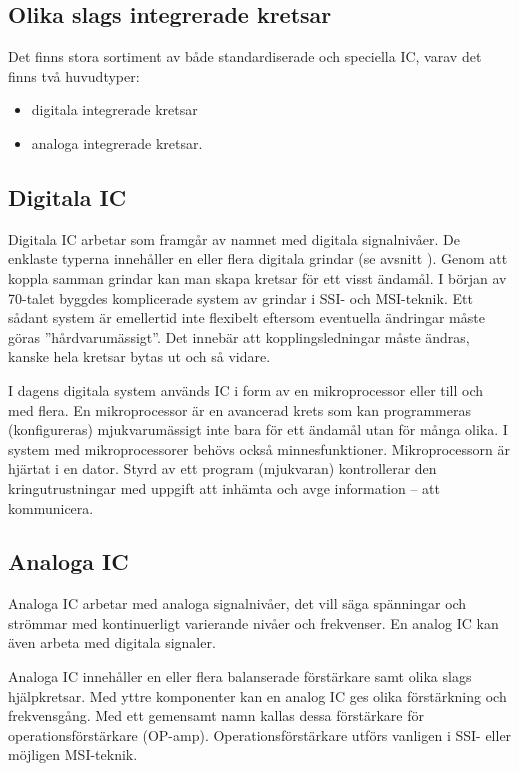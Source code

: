 \subsection{Olika slags integrerade kretsar}

Det finns stora sortiment av både standardiserade och speciella IC, varav det
finns två huvudtyper:
\begin{itemize}
  \item digitala integrerade kretsar
  \item analoga integrerade kretsar.
\end{itemize}

\subsection{Digitala IC}

Digitala IC arbetar som framgår av namnet med digitala signalnivåer.
De enklaste typerna innehåller en eller flera digitala grindar (se avsnitt
).
Genom att koppla samman grindar kan man skapa kretsar för ett visst ändamål.
I början av 70-talet byggdes komplicerade system av grindar i SSI- och
MSI-teknik.
Ett sådant system är emellertid inte flexibelt eftersom eventuella ändringar
måste göras ''hårdvarumässigt''.
Det innebär att kopplingsledningar måste ändras, kanske hela kretsar bytas ut
och så vidare.

I dagens digitala system används IC i form av en mikroprocessor eller till och
med flera.
En mikroprocessor är en avancerad krets som kan programmeras (konfigureras)
mjukvarumässigt inte bara för ett ändamål utan för många olika.
I system med mikroprocessorer behövs också minnesfunktioner.
Mikroprocessorn är hjärtat i en dator.
Styrd av ett program (mjukvaran) kontrollerar den kringutrustningar med uppgift
att inhämta och avge information -- att kommunicera.

\subsection{Analoga IC}

Analoga IC arbetar med analoga signalnivåer, det vill säga spänningar och
strömmar med kontinuerligt varierande nivåer och frekvenser.
En analog IC kan även arbeta med digitala signaler.

Analoga IC innehåller en eller flera balanserade förstärkare samt olika slags
hjälpkretsar.
Med yttre komponenter kan en analog IC ges olika förstärkning och frekvensgång.
Med ett gemensamt namn kallas dessa förstärkare för operationsförstärkare
(OP-amp).
Operationsförstärkare utförs vanligen i SSI- eller möjligen MSI-teknik.


